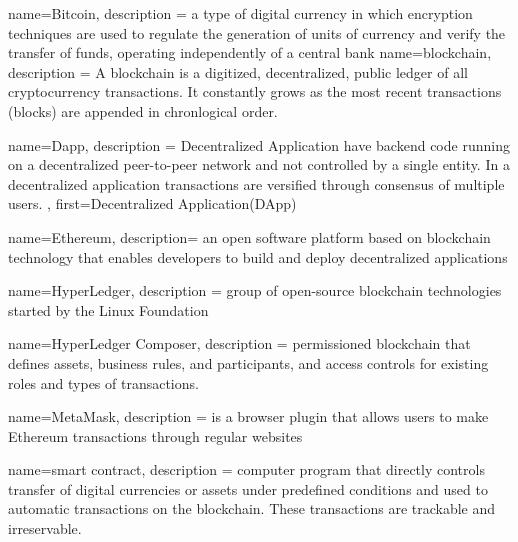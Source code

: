 {
	name={Bitcoin},
	description ={
		a type of digital currency in which encryption techniques are used to regulate the generation of units of currency and verify the transfer of funds, operating independently of a central bank
	}
}
{
	name={blockchain},
	description ={
		A blockchain is a digitized, decentralized, public ledger of all cryptocurrency transactions.  It constantly grows as the most recent transactions (blocks) are appended in chronlogical order.
	}
}


{
	name={Dapp},
	description ={
		Decentralized Application have backend code running on a decentralized peer-to-peer network and not controlled by a single entity. In a decentralized application transactions are versified through consensus of multiple users.
	},
	first={Decentralized Application(DApp)}
}


{
	name={Ethereum},
	description={
		an open software platform based on blockchain technology that enables developers to build and deploy decentralized applications
	}
}

{
	name={HyperLedger},
	description ={
		group of open-source blockchain technologies started by the Linux Foundation
	}
}

{
	name={HyperLedger Composer},
	description ={
		permissioned blockchain that defines assets, business rules, and participants, and access controls for existing roles and types of transactions.
	}
}

{
	name={MetaMask},
	description ={
		is a browser plugin that allows users to make Ethereum transactions through regular websites
	}
}



{
	name={smart contract},
	description ={
		computer program that directly controls transfer of digital currencies or assets under predefined conditions and used to automatic transactions on the blockchain. These transactions are trackable and irreservable.
	}
}

